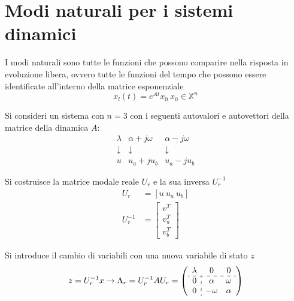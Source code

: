 \section{Modi naturali per i sistemi dinamici}
I modi naturali sono tutte le funzioni che possono comparire nella risposta in
evoluzione libera, ovvero tutte le funzioni del tempo che possono essere
identificate all'interno della matrice esponenziale
$$
x_l(t) = e^{At}x_0\ x_0 \in \mathbb{X}^n
$$

Si consideri un sistema con $n=3$ con i seguenti autovalori e autovettori della
matrice della dinamica $A$:
$$\begin{array}{ccc}
\lambda & \alpha+j\omega & \alpha-j\omega\\
\downarrow &\downarrow &\downarrow \\
u & u_a +j u_b & u_a -j u_b
\end{array}$$

Si costruisce la matrice modale reale $U_r$ e la sua inversa $U_r^{-1}$
$$\begin{aligned}
U_r &= [u \ u_a \ u_b] \\
U_r^{-1} &= \begin{bmatrix}
             v^T\\v_a^T\\v_b^T
            \end{bmatrix}
\end{aligned}$$

Si introduce il cambio di variabili con una nuova variabile di stato $z$
$$
z = U_r^{-1} x\rightarrow \Lambda_r = U_r^{-1}AU_r = \left(
\begin{array}{c:cc}
 \lambda & 0 & 0 \\ \hdashline
 0 & \alpha & \omega \\
 0 & -\omega & \alpha
\end{array}
\right)
$$

